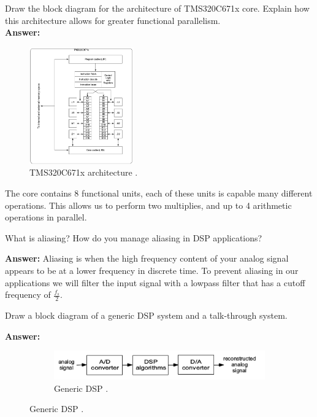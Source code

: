 \documentclass{article}
\begin{document}
\begin{enumerate}
  \begin{item}
	  Draw the block diagram for the architecture of TMS320C671x core. Explain how this architecture allows for greater functional parallelism.\\

  \pagebreak
  \textbf{Answer:}
  \begin{figure}[H]
    \begin{center}
      \includegraphics[width=0.4\textwidth]{img/core_arch.png}
      \caption{TMS320C671x architecture \cite{Welch:2011}.}
    \end{center}
  \end{figure}

    The core contains 8 functional units, each of these units is capable many different operations. 
    This allows us to perform two multiplies, and up to 4 arithmetic operations in parallel.

  \end{item}

  \begin{item}
    What is aliasing? How do you manage aliasing in DSP applications?

  \textbf{Answer:}
    Aliasing is when the high frequency content of your analog signal appears to be at a lower frequency in discrete time.
    To prevent aliasing in our applications we will filter the input signal with a lowpass filter that has a cutoff frequency of $\frac{f_s}{2}$.
  \end{item}

  \begin{item}
    Draw a block diagram of a generic DSP system and a talk-through system.

  \textbf{Answer:}
  \begin{figure}[H]
    \begin{center}

      \begin{subfigure}[b]{0.5\linewidth}
        \includegraphics[width=\linewidth]{img/dsp.png}
        \caption{Generic DSP \cite{Welch:2011}.}
      \end{subfigure}


\end{center}
\end{figure}
\end{item}
\end{enumerate}
\end{document}
